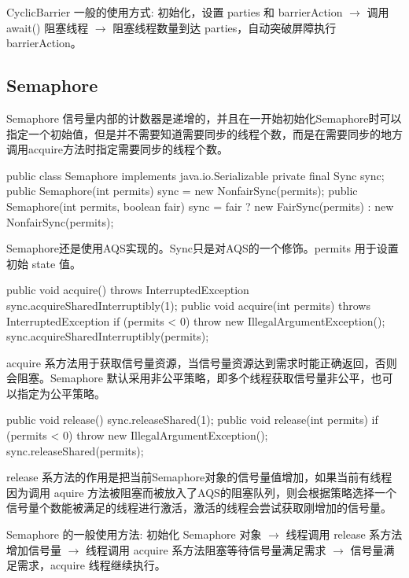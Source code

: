 CyclicBarrier 一般的使用方式: 初始化，设置 parties 和 barrierAction $\rightarrow$ 调用 await() 阻塞线程 $\rightarrow$ 阻塞线程数量到达 parties，自动突破屏障执行 barrierAction。

\subsection{Semaphore}

Semaphore 信号量内部的计数器是递增的，并且在一开始初始化Semaphore时可以指定一个初始值，但是并不需要知道需要同步的线程个数，而是在需要同步的地方调用acquire方法时指定需要同步的线程个数。

\begin{Java}
public class Semaphore implements java.io.Serializable {
    private final Sync sync;
    public Semaphore(int permits) {
        sync = new NonfairSync(permits);
    }
    public Semaphore(int permits, boolean fair) {
        sync = fair ? new FairSync(permits) : new NonfairSync(permits);
    }
}
\end{Java}

Semaphore还是使用AQS实现的。Sync只是对AQS的一个修饰。permits 用于设置初始 state 值。

\begin{Java}
public void acquire() throws InterruptedException {
    sync.acquireSharedInterruptibly(1);
}
public void acquire(int permits) throws InterruptedException {
    if (permits < 0) throw new IllegalArgumentException();
    sync.acquireSharedInterruptibly(permits);
}
\end{Java}

acquire 系方法用于获取信号量资源，当信号量资源达到需求时能正确返回，否则会阻塞。Semaphore 默认采用非公平策略，即多个线程获取信号量非公平，也可以指定为公平策略。

\begin{Java}
public void release() {
    sync.releaseShared(1);
}
public void release(int permits) {
    if (permits < 0) throw new IllegalArgumentException();
    sync.releaseShared(permits);
}
\end{Java}

release 系方法的作用是把当前Semaphore对象的信号量值增加，如果当前有线程因为调用 aquire 方法被阻塞而被放入了AQS的阻塞队列，则会根据策略选择一个信号量个数能被满足的线程进行激活，激活的线程会尝试获取刚增加的信号量。

Semaphore 的一般使用方法: 初始化 Semaphore 对象 $\rightarrow$ 线程调用 release 系方法增加信号量 $\rightarrow$ 线程调用 acquire 系方法阻塞等待信号量满足需求 $\rightarrow$ 信号量满足需求，acquire 线程继续执行。

\newpage